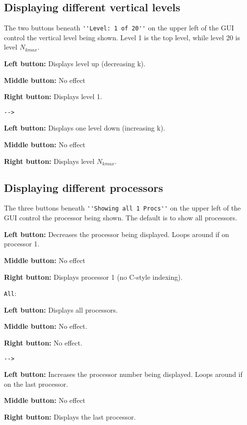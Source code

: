 \documentclass[12pt,oneside]{article}
\begin{document}
\subsection{Displaying different vertical levels}

The two buttons beneath \verb+''Level: 1 of 20''+ on the upper left of the GUI control the vertical level
being shown.  Level 1 is the top level, while level 20 is level $N_{kmax}$.
\begin{list}{}
\item \button{$<--$}
\begin{list}{}
\item {\bf Left button:} Displays level up (decreasing k).
\item {\bf Middle button:} No effect
\item {\bf Right button:} Displays level 1.
\end{list}
\item \verb+-->+
\begin{list}{}
\item {\bf Left button:} Displays one level down (increasing k).
\item {\bf Middle button:} No effect
\item {\bf Right button:} Displays level $N_{kmax}$.
\end{list}
\end{list}

\subsection{Displaying different processors}

The three buttons beneath \verb+''Showing all 1 Procs''+ on the upper left of the GUI control the processor
being shown.  The default is to show all processors.  
\begin{list}{}
\item \button{$<--$}
\begin{list}{}
\item {\bf Left button:} Decreases the processor being displayed.  Loops around if on processor 1.
\item {\bf Middle button:} No effect
\item {\bf Right button:} Displays processor 1 (no C-style indexing).
\end{list}
\item \verb+All+: 
\begin{list}{}
\item {\bf Left button:} Displays all processors.
\item {\bf Middle button:} No effect.
\item {\bf Right button:} No effect.
\end{list}
\item \verb+-->+
\begin{list}{}
\item {\bf Left button:} Increases the processor number being displayed.  Loops around if on the last processor.
\item {\bf Middle button:} No effect
\item {\bf Right button:} Displays the last processor.
\end{list}
\end{list}
\end{document}

